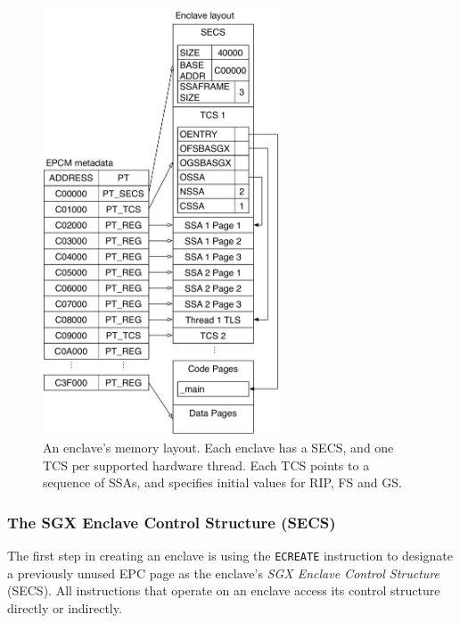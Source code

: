 \begin{figure}[hbt!]
  \centering
  \includegraphics[width=70mm]{figures/enclave_layout.pdf}
  \caption{
    An enclave's memory layout. Each enclave has a SECS, and one TCS per
    supported hardware thread. Each TCS points to a sequence of SSAs, and
    specifies initial values for RIP, FS and GS.
  }
  \label{fig:enclave_layout}
\end{figure}

\subsubsection{The SGX Enclave Control Structure (SECS)}
\label{sec:secs}


The first step in creating an enclave is using the \texttt{ECREATE} instruction
to designate a previously unused EPC page as the enclave's \textit{SGX Enclave
Control Structure} (SECS). All instructions that operate on an enclave access
its control structure directly or indirectly.


